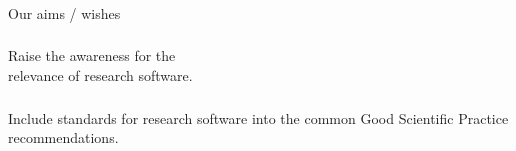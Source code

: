 \documentclass{beamer}
\begin{document}
\begin{frame}
  \frametitle{}
  \begin{block}{}
    \begin{center}
      Our aims / wishes
    \end{center}
  \end{block}
\end{frame}

\begin{frame}
  \frametitle{}
  \begin{block}{}
    \begin{center}
      Raise the awareness for the\\relevance of research software.
    \end{center}
  \end{block}
\end{frame}

\begin{frame}
  \frametitle{}
  \begin{block}{}
    \begin{center}
      Include standards for research software into the common Good
      Scientific Practice recommendations.
    \end{center}
  \end{block}
\end{frame}
\end{document}
